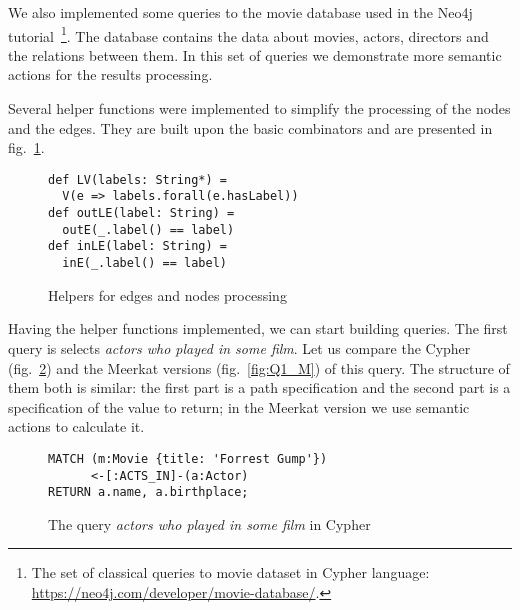 We also implemented some queries to the movie database used in the Neo4j tutorial~\footnote{The set of classical queries to movie dataset in Cypher language: \url{https://neo4j.com/developer/movie-database/}.}.
The database contains the data about movies, actors, directors and the relations between them.
In this set of queries we demonstrate more semantic actions for the results processing. 


Several helper functions were implemented to simplify the processing of the nodes and the edges. 
They are built upon the basic combinators and are presented in fig.~\ref{fig:helpers}.


\begin{figure}[h]
\begin{lstlisting}
def LV(labels: String*) = 
  V(e => labels.forall(e.hasLabel))
def outLE(label: String) = 
  outE(_.label() == label)
def inLE(label: String) = 
  inE(_.label() == label)
\end{lstlisting}
\caption{Helpers for edges and nodes processing}
\label{fig:helpers}
\end{figure}

Having the helper functions implemented, we can start building queries. 
The first query is selects \emph{actors who played in some film}.
Let us compare the Cypher (fig.~\ref{fig:Q1_C}) and the Meerkat versions (fig.~\ref{fig:Q1_M}) of this query.
The structure of them both is similar: the first part is a path specification and the second part is a specification of the value to return; in the Meerkat version we use semantic actions to calculate it.

\begin{figure}[h]
\begin{lstlisting}
MATCH (m:Movie {title: 'Forrest Gump'})
      <-[:ACTS_IN]-(a:Actor)
RETURN a.name, a.birthplace;
\end{lstlisting}
\caption{The query \emph{actors who played in some film} in Cypher}
\label{fig:Q1_C}
\end{figure}


